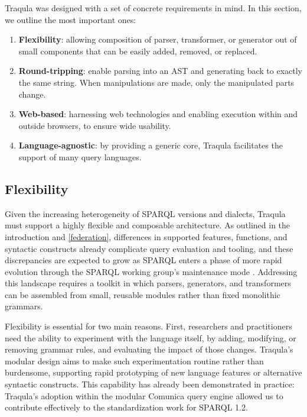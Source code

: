 \documentclass[runningheads]{llncs}
\begin{document}
    Traqula was designed with a set of concrete requirements in mind. In this section, we outline the most important ones:

    \begin{enumerate}
        \item \textbf{Flexibility}: allowing composition of parser, transformer, or generator out of small components that can be easily added, removed, or replaced.
        \item \textbf{Round-tripping}: enable parsing into an AST and generating back to exactly the same string. When manipulations are made, only the manipulated parts change.
        \item \textbf{Web-based}: harnessing web technologies and enabling execution within and outside browsers, to ensure wide usability.
        \item \textbf{Language-agnostic}: by providing a generic core, Traqula facilitates the support of many query languages.
    \end{enumerate}

    \subsection{Flexibility}

    Given the increasing heterogeneity of SPARQL versions and dialects,
    Traqula must support a highly flexible and composable architecture.
    As outlined in the introduction and \autoref{federation}, differences in supported features, functions,
    and syntactic constructs already complicate query evaluation and tooling,
    and these discrepancies are expected to grow as SPARQL enters a phase of more rapid evolution through the SPARQL working group's maintenance mode \cite{modular-parsing}.
    Addressing this landscape requires a toolkit in which parsers, generators, and transformers can be assembled from small, reusable modules rather than fixed monolithic grammars.

    Flexibility is essential for two main reasons.
    First, researchers and practitioners need the ability to experiment with the language itself,
    by adding, modifying, or removing grammar rules, and evaluating the impact of those changes.
    Traqula's modular design aims to make such experimentation routine rather than burdensome,
    supporting rapid prototyping of new language features or alternative syntactic constructs.
    This capability has already been demonstrated in practice:
    Traqula's adoption within the modular Comunica query engine allowed us to contribute effectively to the standardization work for SPARQL 1.2.
\end{document}
